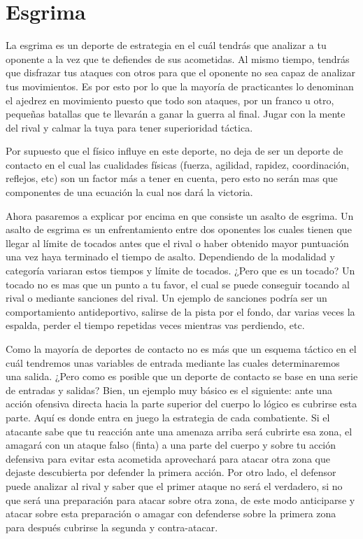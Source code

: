 \section{Esgrima}

La esgrima es un deporte de estrategia en el cuál tendrás que analizar a tu
 oponente a la vez que te defiendes de sus acometidas. Al mismo tiempo, tendrás que
 disfrazar tus ataques con otros para que el oponente no sea capaz de analizar
 tus movimientos. Es por esto por lo que la mayoría de practicantes lo denominan
 el ajedrez en movimiento puesto que todo son ataques, por un franco u otro,
 pequeñas batallas que te llevarán a ganar la guerra al final. Jugar con la mente
 del rival y calmar la tuya para tener superioridad táctica.

Por supuesto que el físico influye en este deporte, no deja de ser un deporte de contacto
 en el cual las cualidades físicas (fuerza, agilidad, rapidez, coordinación, reflejos, etc)
 son un factor más a tener en cuenta, pero esto no serán mas que componentes de una ecuación
 la cual nos dará la victoria.

Ahora pasaremos a explicar por encima en que consiste un asalto de esgrima.
 Un asalto de esgrima es un enfrentamiento entre dos
 oponentes los cuales tienen que llegar al límite de tocados antes que el rival o haber obtenido mayor puntuación
 una vez haya terminado el tiempo de asalto. Dependiendo de la modalidad y categoría
 variaran estos tiempos y límite de tocados. ¿Pero que es un tocado? Un tocado no es mas que
 un punto a tu favor, el cual se puede conseguir tocando al rival o mediante sanciones del rival.
 Un ejemplo de sanciones podría ser un comportamiento antideportivo, salirse de la pista por el fondo,
 dar varias veces la espalda, perder el tiempo repetidas veces mientras vas perdiendo, etc.

Como la mayoría de deportes de contacto no es más que un esquema táctico en el cuál tendremos unas variables
 de entrada mediante las cuales determinaremos una salida. ¿Pero como es posible que un deporte de contacto
 se base en una serie de entradas y salidas? Bien, un ejemplo muy básico es el siguiente: ante una acción ofensiva
 directa hacia la parte superior del cuerpo lo lógico es cubrirse esta parte. Aquí es donde entra en juego
 la estrategia de cada combatiente. Si el atacante sabe que tu reacción ante una amenaza arriba
 será cubrirte esa zona, el amagará con un ataque falso (finta) a una parte del cuerpo y sobre tu acción
 defensiva para evitar esta acometida aprovechará para atacar otra zona que dejaste descubierta por
 defender la primera acción. Por otro lado, el defensor puede analizar al rival y saber que el primer ataque
 no será el verdadero, si no que será una preparación para atacar sobre otra zona, de este modo anticiparse
 y atacar sobre esta preparación o amagar con defenderse sobre la primera zona para después cubrirse la segunda
 y contra-atacar.


